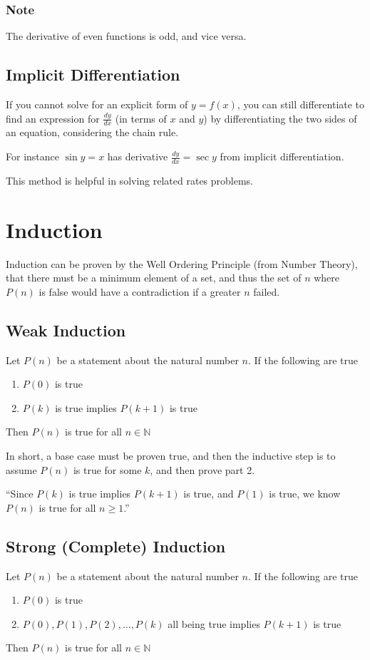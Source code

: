 \documentclass{article}
\begin{document}
\subsubsection{Note} The derivative of even functions is odd, and vice versa.

\subsection{Implicit Differentiation}
If you cannot solve for an explicit form of $y=f(x)$, you can still differentiate to find an expression for $\frac{dy}{dx}$ (in terms of $x$ and $y$) by differentiating the two sides of an equation, considering the chain rule.

For instance $\sin{y}=x$ has derivative $\frac{dy}{dx}=\sec{y}$ from implicit differentiation.

This method is helpful in solving related rates problems.

\section{Induction}
Induction can be proven by the Well Ordering Principle (from Number Theory), that there must be a minimum element of a set, and thus the set of $n$ where $P(n)$ is false would have a contradiction if a greater $n$ failed.

\subsection{Weak Induction}
Let $P(n)$ be a statement about the natural number $n$. If the following are true
\begin{enumerate}
    \item $P(0)$ is true
    \item $P(k)$ is true implies $P(k+1)$ is true
\end{enumerate}
Then $P(n)$ is true for all $n\in\mathbb{N}$

In short, a base case must be proven true, and then the inductive step is to assume $P(n)$ is true for some $k$, and then prove part 2.

``Since $P(k)$ is true implies $P(k+1)$ is true, and $P(1)$ is true, we know $P(n)$ is true for all $n\ge1$.''

\subsection{Strong (Complete) Induction}
Let $P(n)$ be a statement about the natural number $n$. If the following are true
\begin{enumerate}
    \item $P(0)$ is true
    \item $P(0), P(1), P(2), \ldots, P(k)$ all being true implies $P(k+1)$ is true
\end{enumerate}
Then $P(n)$ is true for all $n\in\mathbb{N}$
\end{document}
